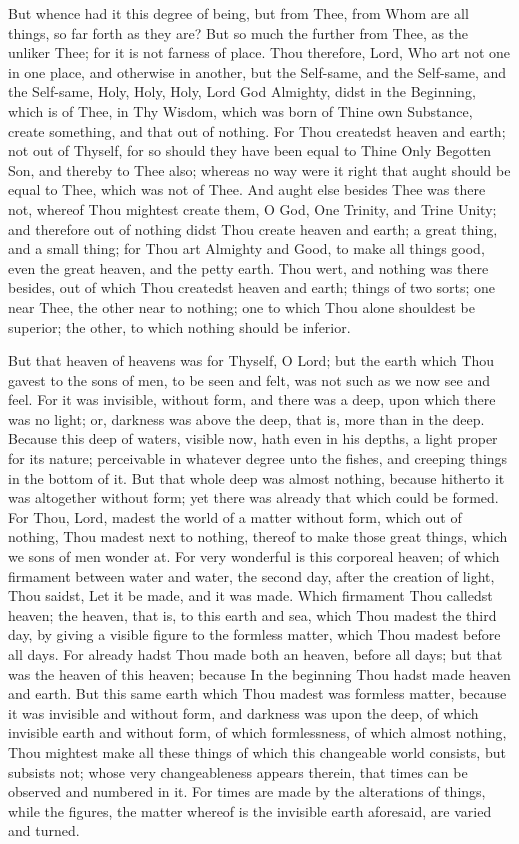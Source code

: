 \documentclass[b5paper,openright,12pt,twoside]{book}
\begin{document}
But whence had it this degree of being, but from Thee, from Whom are all
things, so far forth as they are? But so much the further from Thee, as
the unliker Thee; for it is not farness of place. Thou therefore,
Lord, Who art not one in one place, and otherwise in another, but the
Self-same, and the Self-same, and the Self-same, Holy, Holy, Holy, Lord
God Almighty, didst in the Beginning, which is of Thee, in Thy Wisdom,
which was born of Thine own Substance, create something, and that out of
nothing. For Thou createdst heaven and earth; not out of Thyself, for so
should they have been equal to Thine Only Begotten Son, and thereby to
Thee also; whereas no way were it right that aught should be equal to
Thee, which was not of Thee. And aught else besides Thee was there not,
whereof Thou mightest create them, O God, One Trinity, and Trine Unity;
and therefore out of nothing didst Thou create heaven and earth; a great
thing, and a small thing; for Thou art Almighty and Good, to make all
things good, even the great heaven, and the petty earth. Thou wert, and
nothing was there besides, out of which Thou createdst heaven and earth;
things of two sorts; one near Thee, the other near to nothing; one to
which Thou alone shouldest be superior; the other, to which nothing
should be inferior.

But that heaven of heavens was for Thyself, O Lord; but the earth which
Thou gavest to the sons of men, to be seen and felt, was not such as we
now see and feel. For it was invisible, without form, and there was a
deep, upon which there was no light; or, darkness was above the deep,
that is, more than in the deep. Because this deep of waters, visible
now, hath even in his depths, a light proper for its nature; perceivable
in whatever degree unto the fishes, and creeping things in the bottom
of it. But that whole deep was almost nothing, because hitherto it
was altogether without form; yet there was already that which could be
formed. For Thou, Lord, madest the world of a matter without form, which
out of nothing, Thou madest next to nothing, thereof to make those
great things, which we sons of men wonder at. For very wonderful is this
corporeal heaven; of which firmament between water and water, the second
day, after the creation of light, Thou saidst, Let it be made, and it
was made. Which firmament Thou calledst heaven; the heaven, that is, to
this earth and sea, which Thou madest the third day, by giving a visible
figure to the formless matter, which Thou madest before all days. For
already hadst Thou made both an heaven, before all days; but that was
the heaven of this heaven; because In the beginning Thou hadst made
heaven and earth. But this same earth which Thou madest was formless
matter, because it was invisible and without form, and darkness was
upon the deep, of which invisible earth and without form, of which
formlessness, of which almost nothing, Thou mightest make all these
things of which this changeable world consists, but subsists not; whose
very changeableness appears therein, that times can be observed and
numbered in it. For times are made by the alterations of things, while
the figures, the matter whereof is the invisible earth aforesaid, are
varied and turned.
\end{document}
